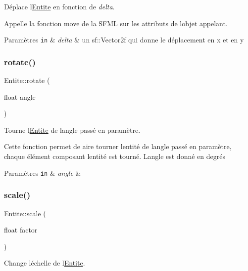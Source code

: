 Déplace l\textquotesingle{}\hyperlink{class_entite}{Entite} en fonction de {\itshape delta}. 

Appelle la fonction move de la S\+F\+ML sur les attributs de l\textquotesingle{}objet appelant. 
\begin{DoxyParams}[1]{Paramètres}
\mbox{\tt in}  & {\em delta} & un {\ttfamily sf\+::\+Vector2f} qui donne le déplacement en x et en y \\
\hline
\end{DoxyParams}
\mbox{\label{class_entite_af1249039d313e4e691a109440663eae7}} 
\subsubsection{\texorpdfstring{rotate()}{rotate()}}
{\footnotesize\ttfamily Entite\+::rotate (\begin{DoxyParamCaption}\item[{float}]{angle }\end{DoxyParamCaption})}



Tourne l\textquotesingle{}\hyperlink{class_entite}{Entite} de l\textquotesingle{}angle passé en paramètre. 

Cette fonction permet de aire tourner l\textquotesingle{}entité de l\textquotesingle{}angle passé en paramètre, chaque élément composant l\textquotesingle{}entité est tourné. L\textquotesingle{}angle est donné en degrés 
\begin{DoxyParams}[1]{Paramètres}
\mbox{\tt in}  & {\em angle} & \\
\hline
\end{DoxyParams}
\mbox{\label{class_entite_a770f6c53856606c4de768bb942299659}} 
\subsubsection{\texorpdfstring{scale()}{scale()}}
{\footnotesize\ttfamily Entite\+::scale (\begin{DoxyParamCaption}\item[{float}]{factor }\end{DoxyParamCaption})}



Change l\textquotesingle{}échelle de l\textquotesingle{}\hyperlink{class_entite}{Entite}. 


